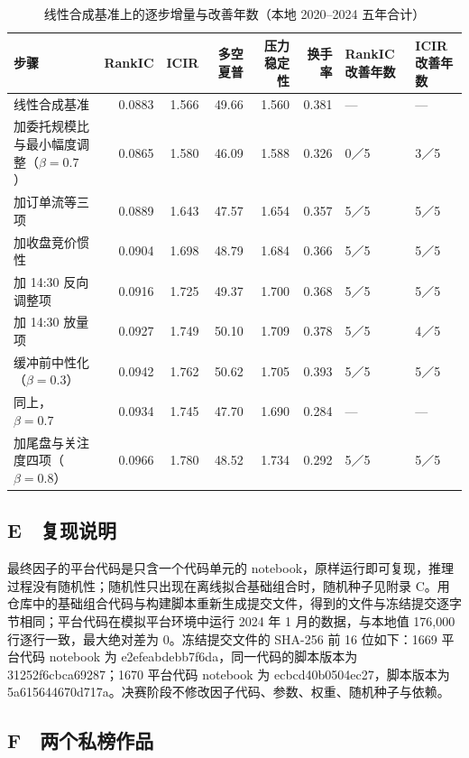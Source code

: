 \documentclass[UTF8,a4paper,zihao=-4,fontset=none]{ctexart}
\newcommand{\tablesetup}{\small\linespread{1.08}\selectfont\renewcommand{\arraystretch}{1.22}}
\begin{document}
\begin{table}[htbp]
\caption{线性合成基准上的逐步增量与改善年数（本地 2020–2024 五年合计）}\label{tab:chainb}
\centering
{\tablesetup
\begin{tabularx}{\textwidth}{@{}L rrrrr P{1.25cm} P{1.15cm}@{}}
\toprule
步骤 & RankIC & ICIR & 多空夏普 & 压力稳定性 & 换手率 & RankIC 改善年数 & ICIR 改善年数\\
\midrule
线性合成基准 & 0.0883 & 1.566 & 49.66 & 1.560 & 0.381 & — & —\\
加委托规模比与最小幅度调整（$\beta=0.7$） & 0.0865 & 1.580 & 46.09 & 1.588 & 0.326 & 0／5 & 3／5\\
加订单流等三项 & 0.0889 & 1.643 & 47.57 & 1.654 & 0.357 & 5／5 & 5／5\\
加收盘竞价惯性 & 0.0904 & 1.698 & 48.79 & 1.684 & 0.366 & 5／5 & 5／5\\
加 14:30 反向调整项 & 0.0916 & 1.725 & 49.37 & 1.700 & 0.368 & 5／5 & 5／5\\
加 14:30 放量项 & 0.0927 & 1.749 & 50.10 & 1.709 & 0.378 & 5／5 & 4／5\\
缓冲前中性化（$\beta=0.3$） & 0.0942 & 1.762 & 50.62 & 1.705 & 0.393 & 5／5 & 5／5\\
同上，$\beta=0.7$ & 0.0934 & 1.745 & 47.70 & 1.690 & 0.284 & — & —\\
加尾盘与关注度四项（$\beta=0.8$） & 0.0966 & 1.780 & 48.52 & 1.734 & 0.292 & 5／5 & 5／5\\
\bottomrule
\end{tabularx}}
\end{table}


\subsection*{E　复现说明}

最终因子的平台代码是只含一个代码单元的 notebook，原样运行即可复现，推理过程没有随机性；随机性只出现在离线拟合基础组合时，随机种子见附录 C。用仓库中的基础组合代码与构建脚本重新生成提交文件，得到的文件与冻结提交逐字节相同；平台代码在模拟平台环境中运行 2024 年 1 月的数据，与本地值 176,000 行逐行一致，最大绝对差为 0。冻结提交文件的 SHA-256 前 16 位如下：1669 平台代码 notebook 为 e2efeabdebb7f6da，同一代码的脚本版本为 31252f6cbca69287；1670 平台代码 notebook 为 ecbcd40b0504ec27，脚本版本为 5a615644670d717a。决赛阶段不修改因子代码、参数、权重、随机种子与依赖。

\subsection*{F　两个私榜作品}
\end{document}
